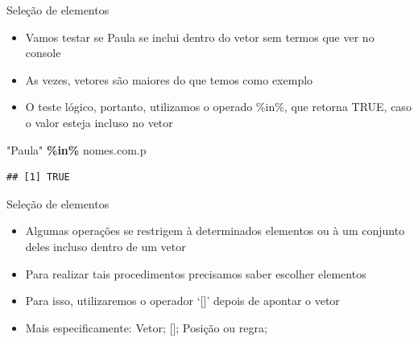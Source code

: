 \documentclass[
  10pt,
  ignorenonframetext,
]{beamer}
\newenvironment{Shaded}{\begin{snugshade}}{\end{snugshade}}
\newcommand{\NormalTok}[1]{#1}
\newcommand{\OperatorTok}[1]{\textcolor[rgb]{0.81,0.36,0.00}{\textbf{#1}}}
\newcommand{\StringTok}[1]{\textcolor[rgb]{0.31,0.60,0.02}{#1}}
\providecommand{\tightlist}{%
  \setlength{\itemsep}{0pt}\setlength{\parskip}{0pt}}
\begin{document}
\begin{frame}[fragile]{Seleção de elementos}
\protect\hypertarget{seleuxe7uxe3o-de-elementos-1}{}
\begin{itemize}
\tightlist
\item
  Vamos testar se Paula se inclui dentro do vetor sem termos que ver no
  console
\item
  As vezes, vetores são maiores do que temos como exemplo
\item
  O teste lógico, portanto, utilizamos o operado \%in\%, que retorna
  TRUE, caso o valor esteja incluso no vetor
\end{itemize}

\begin{Shaded}
\begin{Highlighting}[]
\StringTok{"Paula"} \OperatorTok{\%in\%}\StringTok{ }\NormalTok{nomes.com.p}
\end{Highlighting}
\end{Shaded}

\begin{verbatim}
## [1] TRUE
\end{verbatim}
\end{frame}

\begin{frame}{Seleção de elementos}
\protect\hypertarget{seleuxe7uxe3o-de-elementos-2}{}
\begin{itemize}
\tightlist
\item
  Algumas operações se restrigem à determinados elementos ou à um
  conjunto deles incluso dentro de um vetor
\item
  Para realizar tais procedimentos precisamos saber escolher elementos
\item
  Para isso, utilizaremos o operador `{[}{]}' depois de apontar o vetor
\item
  Mais especificamente: Vetor; {[}{]}; Posição ou regra;
\end{itemize}
\end{frame}
\end{document}
